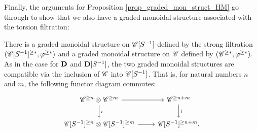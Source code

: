 Finally, the arguments for Proposition \ref{prop_graded_mon_struct_HM} go 
through to show that we also have a graded monoidal structure 
associated with the torsion filtration:

\begin{thm}
There is a graded monoidal structure on $\CatLoc{C}{S}$ defined
by the strong filtration $(\Prerad{*}{\CatLoc{C}{S}}, \prerad{*})$ 
and a graded monoidal structure on $\Cat{C}$ defined by 
$(\Prerad{*}{\Cat{C}}, \prerad{*})$. As in the case for $\DCat$ and 
$\DCatLoc{S}$, the two graded monoidal structures are compatible 
via the inclusion of $\Cat{C}$ into $\CatLoc{C}{S}$. That is, for 
natural numbers $n$ and $m$, the following functor diagram 
commutes:
\[
\begin{tikzcd}
\Prerad{n}{\Cat{C}} \tensor \Prerad{m}{\Cat{C}} \arrow{r} \arrow{d}{i} &
\Prerad{n + m}{\Cat{C}} \arrow{d}{i} \\
\Prerad{n}{\CatLoc{C}{S}} \tensor \Prerad{m}{\CatLoc{C}{S}} \arrow{r} &
\Prerad{n + m}{\CatLoc{C}{S}}.
\end{tikzcd}
\]
\end{thm}
